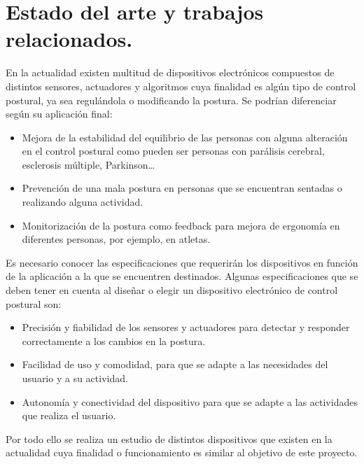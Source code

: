 \section{Estado del arte y trabajos relacionados.}

En la actualidad existen multitud de dispositivos electrónicos \cite{dispositivos} compuestos de distintos sensores, actuadores y algoritmos cuya finalidad es algún tipo de control postural, ya sea regulándola o modificando la postura. Se podrían diferenciar según su aplicación final: 
\begin{itemize}
    \item Mejora de la estabilidad del equilibrio de las personas con alguna alteración en el control postural como pueden ser personas con parálisis cerebral, esclerosis múltiple, Parkinson… 

    \item Prevención de una mala postura en personas que se encuentran sentadas o realizando alguna actividad. 

    \item Monitorización de la postura como feedback para mejora de ergonomía en diferentes personas, por ejemplo, en atletas\cite{Deportistas_1,Deportistas_2}.
\end{itemize}

Es necesario conocer las especificaciones que requerirán los dispositivos en función de la aplicación a la que se encuentren destinados. Algunas especificaciones que se deben tener en cuenta al diseñar o elegir un dispositivo electrónico de control postural son: 
\begin{itemize}
    \item Precisión y fiabilidad de los sensores y actuadores para detectar y responder correctamente a los cambios en la postura. 

    \item Facilidad de uso y comodidad, para que se adapte a las necesidades del usuario y a su actividad. 

    \item Autonomía y conectividad del dispositivo para que se adapte a las actividades que realiza el usuario. 
\end{itemize}

Por todo ello se realiza un estudio de distintos dispositivos que existen en la actualidad cuya finalidad o funcionamiento es similar al objetivo de este proyecto. 

